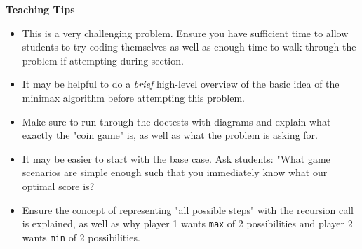 \begin{guide}
\begin{blocksection}
   \textbf{Teaching Tips}
   \begin{itemize}
   	   \item This is a very challenging problem. Ensure you have sufficient time to allow students to try coding themselves as well as enough time to walk through the problem if attempting during section.
   	   \item It may be helpful to do a \textit{brief} high-level overview of the basic idea of the minimax algorithm before attempting this problem.
       \item Make sure to run through the doctests with diagrams and explain what exactly the "coin game" is, as well as what the problem is asking for.
       \item It may be easier to start with the base case. Ask students: "What game scenarios are simple enough such that you immediately know what our optimal score is?
       \item Ensure the concept of representing "all possible steps" with the recursion call is explained, as well as why player 1 wants \verb|max| of 2 possibilities and player 2 wants \verb|min| of 2 possibilities.
   \end{itemize}
\end{blocksection}
\end{guide}
